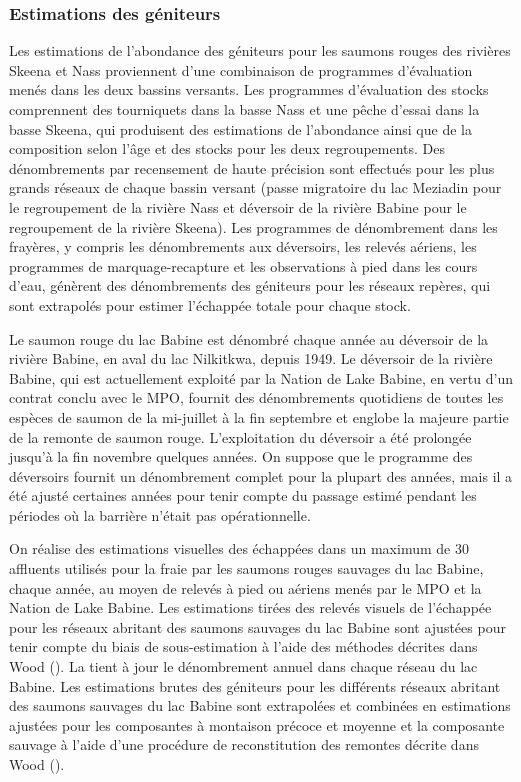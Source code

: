 \documentclass[french,11pt]{book}
\begin{document}
\subsubsection{Estimations des géniteurs}\label{SpnEst}

Les estimations de l'abondance des géniteurs pour les saumons rouges des rivières Skeena et Nass proviennent d'une combinaison de programmes d'évaluation menés dans les deux bassins versants. Les programmes d'évaluation des stocks comprennent des tourniquets dans la basse Nass et une pêche d'essai dans la basse Skeena, qui produisent des estimations de l'abondance ainsi que de la composition selon l'âge et des stocks pour les deux regroupements. Des dénombrements par recensement de haute précision sont effectués pour les plus grands réseaux de chaque bassin versant (passe migratoire du lac Meziadin pour le regroupement de la rivière Nass et déversoir de la rivière Babine pour le regroupement de la rivière Skeena). Les programmes de dénombrement dans les frayères, y compris les dénombrements aux déversoirs, les relevés aériens, les programmes de marquage-recapture et les observations à pied dans les cours d'eau, génèrent des dénombrements des géniteurs pour les réseaux repères, qui sont extrapolés pour estimer l'échappée totale pour chaque stock.

Le saumon rouge du lac Babine est dénombré chaque année au déversoir de la rivière Babine, en aval du lac Nilkitkwa, depuis 1949. Le déversoir de la rivière Babine, qui est actuellement exploité par la Nation de Lake Babine, en vertu d'un contrat conclu avec le MPO, fournit des dénombrements quotidiens de toutes les espèces de saumon de la mi-juillet à la fin septembre et englobe la majeure partie de la remonte de saumon rouge. L'exploitation du déversoir a été prolongée jusqu'à la fin novembre quelques années. On suppose que le programme des déversoirs fournit un dénombrement complet pour la plupart des années, mais il a été ajusté certaines années pour tenir compte du passage estimé pendant les périodes où la barrière n'était pas opérationnelle.

On réalise des estimations visuelles des échappées dans un maximum de 30 affluents utilisés pour la fraie par les saumons rouges sauvages du lac Babine, chaque année, au moyen de relevés à pied ou aériens menés par le MPO et la Nation de Lake Babine. Les estimations tirées des relevés visuels de l'échappée pour les réseaux abritant des saumons sauvages du lac Babine sont ajustées pour tenir compte du biais de sous-estimation à l'aide des méthodes décrites dans Wood (). La  tient à jour le dénombrement annuel dans chaque réseau du lac Babine. Les estimations brutes des géniteurs pour les différents réseaux abritant des saumons sauvages du lac Babine sont extrapolées et combinées en estimations ajustées pour les composantes à montaison précoce et moyenne et la composante sauvage à l'aide d'une procédure de reconstitution des remontes décrite dans Wood ().
\end{document}
